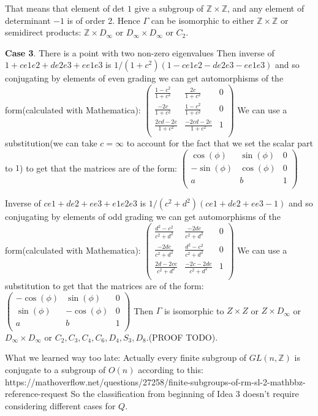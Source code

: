 \documentclass[a4paper]{article}
\begin{document}
That means that element of det $1$ give a subgroup of $\mathbb{Z} \times \mathbb{Z}$, and any element of determinant $-1$ is of order 2.
Hence $\Gamma$ can be isomorphic to either $\mathbb{Z} \times \mathbb{Z}$ or semidirect products: $\mathbb{Z} \times D_\infty$ or $D_\infty \times D_\infty$ or $C_2$.

\textbf{Case 3}. There is a point with two non-zero eigenvalues
Then inverse of $1+c e1e2+d e2e3+ e e1e3$ is $1/(1+c^2)(1-c e1e2-d e2e3- e e1e3)$ and so conjugating by elements of even grading we can get automorphisms of the form(calculated with Mathematica):
$\begin{pmatrix}
\frac{1-c^2}{1+c^2} & \frac{2c}{1+c^2} &0 \\ 
\frac{-2c}{1+c^2} & \frac{1-c^2}{1+c^2} & 0\\
\frac{2cd-2e}{1+c^2} & \frac{-2cd-2e}{1+c^2} &  1\\
\end{pmatrix}$
We can use a substitution(we can take $c=\infty$ to account for the fact that we set the scalar part to $1$) to get that the matrices are of the form:
$\begin{pmatrix}
\cos(\phi) & \sin(\phi) &0 \\ 
-\sin(\phi) & \cos(\phi) & 0\\
a & b &  1\\
\end{pmatrix}$

Inverse of $c e1+d e2+ e e3+ e1e2e3$ is $1/(c^2+d^2) (c e1 + d e2 + e e3 -1)$ and so conjugating by elements of odd grading we can get automorphisms of the form(calculated with Mathematica):
$\begin{pmatrix}
\frac{d^2-c^2}{c^2+d^2} & \frac{-2 d c}{c^2+d^2} &0 \\ 
\frac{-2 d c}{c^2+d^2} & \frac{d^2-c^2}{c^2+d^2} & 0\\
\frac{2d-2ce}{c^2+d^2} & \frac{-2c-2de}{c^2+d^2} &  1\\
\end{pmatrix}$
We can use a substitution to get that the matrices are of the form:
$\begin{pmatrix}
-\cos(\phi) & \sin(\phi) &0 \\ 
\sin(\phi) & -\cos(\phi) & 0\\
a & b &  1\\
\end{pmatrix}$
Then $\Gamma$ is isomorphic to $Z \times Z$ or $Z \times D_\infty$ or $D_\infty \times D_\infty$ or $C_2, C_3, C_4, C_6, D_4, S_3,D_8$.(PROOF TODO).

What we learned way too late:
Actually every finite subgroup of $GL(n, \mathbb{Z})$ is conjugate to a subgroup of $O(n)$ according to this:
https://mathoverflow.net/questions/27258/finite-subgroups-of-rm-sl-2-mathbbz-reference-request
So the classification from beginning of Idea 3 doesn't require considering different cases for $Q$.
\end{document}
